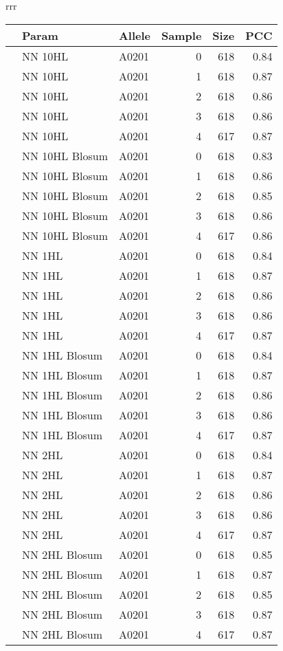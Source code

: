 \begin{table*}[h]\scriptsize
\begin{center}
\begin{tabular}{rrr}

\begin{tabular}{rllrrr}
  \hline
 & Param & Allele & Sample & Size & PCC \\ 
  \hline
   & NN 10HL & A0201 &   0 & 618 & 0.84 \\ 
   & NN 10HL & A0201 &   1 & 618 & 0.87 \\ 
   & NN 10HL & A0201 &   2 & 618 & 0.86 \\ 
   & NN 10HL & A0201 &   3 & 618 & 0.86 \\ 
   & NN 10HL & A0201 &   4 & 617 & 0.87 \\ 
   \hline
   & NN 10HL Blosum & A0201 &   0 & 618 & 0.83 \\ 
   & NN 10HL Blosum & A0201 &   1 & 618 & 0.86 \\ 
   & NN 10HL Blosum & A0201 &   2 & 618 & 0.85 \\ 
   & NN 10HL Blosum & A0201 &   3 & 618 & 0.86 \\ 
   & NN 10HL Blosum & A0201 &   4 & 617 & 0.86 \\ 
   \hline
   & NN 1HL & A0201 &   0 & 618 & 0.84 \\ 
   & NN 1HL & A0201 &   1 & 618 & 0.87 \\ 
   & NN 1HL & A0201 &   2 & 618 & 0.86 \\ 
   & NN 1HL & A0201 &   3 & 618 & 0.86 \\ 
   & NN 1HL & A0201 &   4 & 617 & 0.87 \\ 
   \hline
   & NN 1HL Blosum & A0201 &   0 & 618 & 0.84 \\ 
   & NN 1HL Blosum & A0201 &   1 & 618 & 0.87 \\ 
   & NN 1HL Blosum & A0201 &   2 & 618 & 0.86 \\ 
   & NN 1HL Blosum & A0201 &   3 & 618 & 0.86 \\ 
   & NN 1HL Blosum & A0201 &   4 & 617 & 0.87 \\ 
   \hline
   & NN 2HL & A0201 &   0 & 618 & 0.84 \\ 
   & NN 2HL & A0201 &   1 & 618 & 0.87 \\ 
   & NN 2HL & A0201 &   2 & 618 & 0.86 \\ 
   & NN 2HL & A0201 &   3 & 618 & 0.86 \\ 
   & NN 2HL & A0201 &   4 & 617 & 0.87 \\ 
   \hline
   & NN 2HL Blosum & A0201 &   0 & 618 & 0.85 \\ 
   & NN 2HL Blosum & A0201 &   1 & 618 & 0.87 \\ 
   & NN 2HL Blosum & A0201 &   2 & 618 & 0.85 \\ 
   & NN 2HL Blosum & A0201 &   3 & 618 & 0.87 \\ 
   & NN 2HL Blosum & A0201 &   4 & 617 & 0.87 \\ 
   \hline
\end{tabular}



\end{tabular}
\end{center}
\end{table*}

